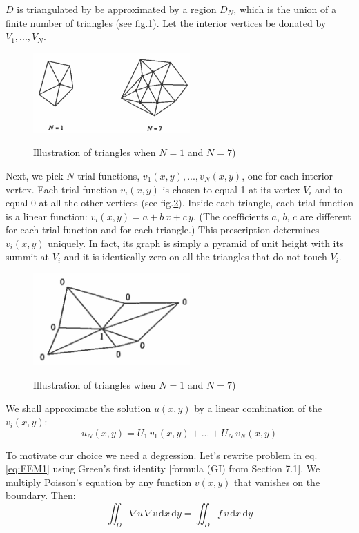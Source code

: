 \documentclass[../main.tex]{subfiles}
\begin{document}
$D$ is triangulated by be approximated by a region $D_N$, which is the union of a finite number of triangles (see fig.\ref{fig:FEM1}). Let the interior vertices be donated by $V_1,...,V_N$.

\begin{figure}[h]
    \caption{Illustration of triangles when $N = 1$ and $N = 7$)}
    \centering
    \includegraphics[width=6cm]{images/FEM1.png}
    \label{fig:FEM1}
\end{figure}

Next, we pick $N$ trial functions, $v_1(x,y),...,v_N(x,y)$, one for each interior vertex. Each trial function $v_i(x,y)$ is chosen to equal 1 at its vertex $V_i$ and to equal 0 at all the other vertices (see fig.\ref{fig:FEM2}). Inside each triangle, each trial function is a linear function: $v_i(x,y) = a + b \, x + c \, y$. (The coefficients $a$, $b$, $c$ are different for each trial function and for each triangle.) This prescription determines $v_i(x,y)$ uniquely. In fact, its graph is simply a pyramid of unit height with its summit at $V_i$ and it is identically zero on all the triangles that do not touch $V_i$.

\begin{figure}[h]
    \caption{Illustration of triangles when $N = 1$ and $N = 7$)}
    \centering
    \includegraphics[width=6cm]{images/FEM2.png}
    \label{fig:FEM2}
\end{figure}

We shall approximate the solution $u(x,y)$ by a linear combination of the $v_i(x,y)$:
\begin{equation}
    u_N(x,y) = U_1 \, v_1(x,y) + ... + U_N \, v_N(x,y) \label{eq:FEM2}
\end{equation}

To motivate our choice we need a degression. Let's rewrite problem in eq.\ref{eq:FEM1} using Green's first identity [formula (GI) from Section 7.1]. We multiply Poisson's equation by any function $v(x,y)$ that vanishes on the boundary. Then:
\begin{equation}
    \iint_D \nabla u \, \nabla v \, \mathrm{d}x \, \mathrm{d}y = \iint_D f \, v \, \mathrm{d}x \, \mathrm{d}y \label{eq:FEM3}
\end{equation}
\end{document}
